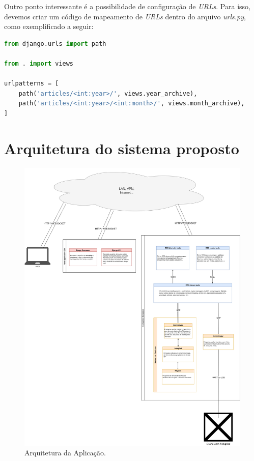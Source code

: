 \documentclass[12pt,a4paper,oneside]{book}
\begin{document}
Outro ponto interessante é a possibilidade de configuração de \textit{URLs}. Para isso, devemos criar um código de mapeamento de \textit{URLs} dentro do arquivo \textit{urls.py}, como exemplificado a seguir:

\begin{lstlisting}[language=Python]
from django.urls import path

from . import views

urlpatterns = [
    path('articles/<int:year>/', views.year_archive),
    path('articles/<int:year>/<int:month>/', views.month_archive),
]
\end{lstlisting}

\newpage

\section{Arquitetura do sistema proposto}

%
\begin{figure}[!htbp]
  \centering
  \includegraphics[width=1\textwidth]{Images/Diagramas/CCS_ARQ.png}
  \caption{Arquitetura da Aplicação.}
  \label{fig:CCS_ARQ.png.0}
\end{figure}
%
\end{document}
